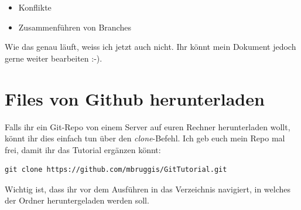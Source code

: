 \documentclass[twoside, 11pr]{article}
\begin{document}
\begin{itemize}
  \item Konflikte
  \item Zusammenführen von Branches
\end{itemize}

Wie das genau läuft, weiss ich jetzt auch nicht. Ihr könnt mein Dokument jedoch gerne weiter bearbeiten :-).

\section{Files von Github herunterladen}

Falls ihr ein Git-Repo von einem Server auf euren Rechner herunterladen wollt, könnt ihr dies einfach tun über den \textit{clone}-Befehl. Ich geb euch mein Repo mal frei, damit ihr das Tutorial ergänzen könnt:

\begin{lstlisting}
git clone https://github.com/mbruggis/GitTutorial.git
\end{lstlisting}

Wichtig ist, dass ihr vor dem Ausführen in das Verzeichnis navigiert, in welches der Ordner heruntergeladen werden soll.





%
%




\end{document}
